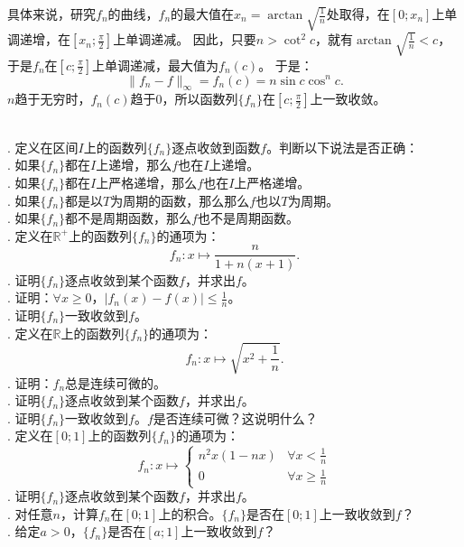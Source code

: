 \documentclass[12pt,UTF8]{ctexbook}
\begin{document}
具体来说，研究$f_n$的曲线，$f_n$的最大值在$x_n = \arctan{\sqrt{\frac{1}{n}}}$处取得，在$[0;x_n]$上单调递增，在$\left[x_n;\frac{\pi}{2}\right]$上单调递减。
因此，只要$n>\cot^2{c}$，就有$\arctan{\sqrt{\frac{1}{n}}} < c$，于是$f_n$在$\left[c;\frac{\pi}{2}\right]$上单调递减，最大值为$f_n(c)$。
于是：
$$ \| f_n - f\|_{\infty} = f_n(c) = n\sin{c}\cos^n{c}.$$
$n$趋于无穷时，$f_n(c)$趋于$0$，所以函数列$\{f_n\}$在$\left[c;\frac{\pi}{2}\right]$上一致收敛。

\begin{xt}
    \mbox{} \\
    . 定义在区间$I$上的函数列$\{f_n\}$逐点收敛到函数$f$。判断以下说法是否正确：\\
    . 如果$\{f_n\}$都在$I$上递增，那么$f$也在$I$上递增。\\
    . 如果$\{f_n\}$都在$I$上严格递增，那么$f$也在$I$上严格递增。\\
    . 如果$\{f_n\}$都是以$T$为周期的函数，那么那么$f$也以$T$为周期。\\
    . 如果$\{f_n\}$都不是周期函数，那么$f$也不是周期函数。\\
    . 定义在$\mathbb{R}^+$上的函数列$\{f_n\}$的通项为：
    $$ f_n: x\mapsto \frac{n}{1 + n( x + 1)}. $$
    . 证明$\{f_n\}$逐点收敛到某个函数$f$，并求出$f$。\\
    . 证明：$\forall x \geqslant 0$，$|f_n(x) - f(x)| \leqslant \frac{1}{n}$。\\
    . 证明$\{f_n\}$一致收敛到$f$。\\
    . 定义在$\mathbb{R}$上的函数列$\{f_n\}$的通项为：
    $$ f_n: x\mapsto \sqrt{x^2 + \frac{1}{n}}. $$
    . 证明：$f_n$总是连续可微的。\\
    . 证明$\{f_n\}$逐点收敛到某个函数$f$，并求出$f$。\\
    . 证明$\{f_n\}$一致收敛到$f$。$f$是否连续可微？这说明什么？\\
    . 定义在$[0;1]$上的函数列$\{f_n\}$的通项为：
    $$ f_n: x\mapsto \begin{cases}
        n^2x(1 - nx) & \forall x < \frac{1}{n} \\
        0 & \forall x \geqslant \frac{1}{n}
    \end{cases} $$
    . 证明$\{f_n\}$逐点收敛到某个函数$f$，并求出$f$。\\
    . 对任意$n$，计算$f_n$在$[0;1]$上的积合。$\{f_n\}$是否在$[0;1]$上一致收敛到$f$？\\
    . 给定$a>0$，$\{f_n\}$是否在$[a;1]$上一致收敛到$f$？
\end{xt}
\end{document}
